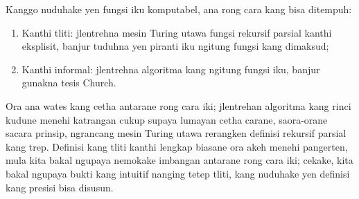 \documentclass[../../../include/open-logic-section]{subfiles}
\begin{document}
Kanggo nuduhake yen fungsi iku komputabel,
ana rong cara kang bisa ditempuh:
\begin{enumerate}
\item Kanthi tliti: jlentrehna mesin Turing
  utawa fungsi rekursif parsial kanthi eksplisit,
  banjur tuduhna yen piranti iku ngitung fungsi
  kang dimaksud;
\item Kanthi informal: jlentrehna algoritma kang
  ngitung fungsi iku, banjur gunakna tesis Church.
\end{enumerate}
Ora ana wates kang cetha antarane rong cara iki;
jlentrehan algoritma kang rinci kudune menehi
katrangan cukup supaya lumayan cetha carane,
saora-orane sacara prinsip, ngrancang mesin
Turing utawa rerangken definisi rekursif parsial
kang trep. Definisi kang tliti kanthi lengkap
biasane ora akeh menehi pangerten, mula kita bakal
ngupaya nemokake imbangan antarane rong cara
iki; cekake, kita bakal ngupaya bukti kang
intuitif nanging tetep tliti,
kang nuduhake yen definisi kang presisi bisa disusun.
\end{document}

